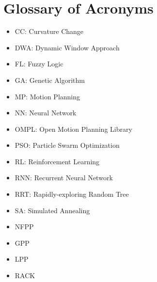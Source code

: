 \chapter*{Glossary of Acronyms}


\begin{itemize}
        \item CC: Curvature Change
        \item DWA: Dynamic Window Approach
        \item FL: Fuzzy Logic
        \item GA: Genetic Algorithm
        \item MP: Motion Planning
        \item NN: Neural Network
        \item OMPL: Open Motion Planning Library
        \item PSO: Particle Swarm Optimization
        \item RL: Reinforcement Learning
        \item RNN: Recurrent Neural Network
        \item RRT: Rapidly-exploring Random Tree
        \item SA: Simulated Annealing
        \item NFPP 
        \item GPP
        \item LPP
        \item RACK
\end{itemize}

\newpage







